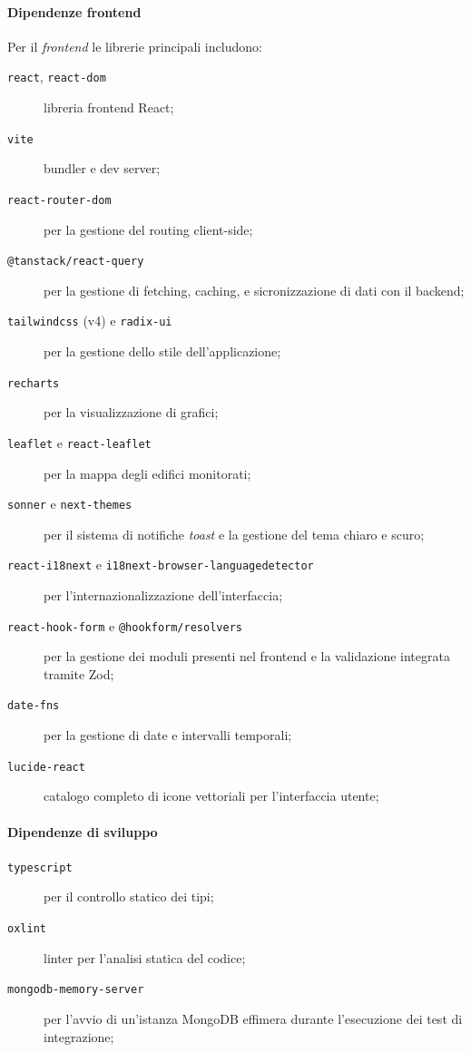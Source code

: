     \paragraph{Dipendenze frontend} Per il \textit{frontend} le librerie principali includono:
    \begin{description}
        \item[\texttt{react}, \texttt{react-dom}] libreria frontend React;
        \item[\texttt{vite}] bundler e dev server;
        \item[\texttt{react-router-dom}] per la gestione del routing client-side;
        \item[\texttt{@tanstack/react-query}] per la gestione di fetching, caching, e sicronizzazione di dati con il backend;
        \item[\texttt{tailwindcss} (v4) e \texttt{radix-ui}] per la gestione dello stile dell'applicazione;
        \item[\texttt{recharts}] per la visualizzazione di grafici;
        \item[\texttt{leaflet} e \texttt{react-leaflet}] per la mappa degli edifici monitorati;
        \item[\texttt{sonner} e \texttt{next-themes}] per il sistema di notifiche \textit{toast} e la gestione del tema chiaro e scuro;
        \item[\texttt{react-i18next} e \texttt{i18next-browser-languagedetector}] per l'internazionalizzazione dell'interfaccia;
        \item[\texttt{react-hook-form} e \texttt{@hookform/resolvers}] per la gestione dei moduli presenti nel frontend e la validazione integrata tramite Zod;
        \item[\texttt{date-fns}] per la gestione di date e intervalli temporali;
        \item[\texttt{lucide-react}] catalogo completo di icone vettoriali per l'interfaccia utente;
    \end{description}
    \paragraph{Dipendenze di sviluppo}
    \begin{description}
        \item[\texttt{typescript}] per il controllo statico dei tipi;
        \item[\texttt{oxlint}] linter per l'analisi statica del codice;
        \item[\texttt{mongodb-memory-server}] per l'avvio di un'istanza MongoDB effimera durante l'esecuzione dei test di integrazione;
    \end{description}

